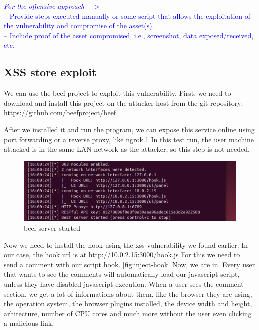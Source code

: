 \documentclass{article}
\begin{document}
\textcolor{blue}{\textit{For the offensive approach} $->$\\
    -- Provide steps executed manually or some script that allows the exploitation of the vulnerability and compromise of the asset(s).\\
    -- Include proof of the asset compromised, i.e., screenshot, data exposed/received, etc. }


\subsection{XSS store exploit}
\label{section:xss-store-exploit}
We can use the beef project to exploit this vulnerability. First, we need to download and install this project on the attacker host from the git repository: https://github.com/beefproject/beef.

After we installed it and run the program, we can expose this service online using port forwarding or a reverse proxy, like ngrok.\ref{fig:beef-server-started}
In this test run, the user machine attacked is in the same LAN network as the attacker, so this step is not needed.

\begin{figure}
    \centering
    \includegraphics[width=1\linewidth]{Figures/beef/beef-server-started.png}
    \caption{\label{fig:beef-server-started}beef server started}
\end{figure}


Now we need to install the hook using the xss vulnerability we found earlier. In our case, the hook url is at http://10.0.2.15:3000/hook.js
For this we need to send a comment with our script hook. \ref{fig:inject-hook}
Now, we are in. Every user that wants to see the comments will automatically load our javascript script, unless they have disabled javascript execution.
When a user sees the comment section, we get a lot of informations about them, like the browser they are using, the operation system, the browser plugins installed, the device width and height, arhitecture, number of CPU cores and much more without the user even clicking a malicious link.
\end{document}
